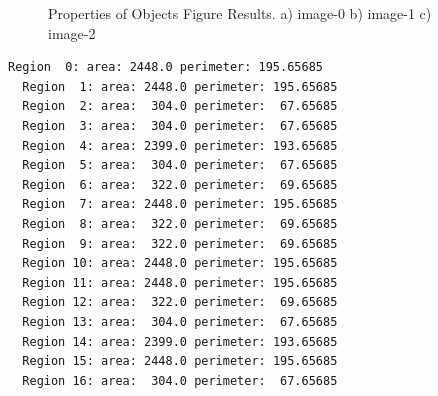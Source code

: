 \documentclass[]{IEEEtran}
\begin{document}
\begin{figure}[]
  \centering
  \caption{Properties of Objects Figure Results. a) image-0 b) image-1 c) image-2}
  \label{fig:labeled}
\end{figure}

\begin{lstlisting}[language=sh, caption={Output for Extracted Properties for Image 0}, label={code:out-1-1}]
  Region  0: area: 2448.0 perimeter: 195.65685 
  Region  1: area: 2448.0 perimeter: 195.65685 
  Region  2: area:  304.0 perimeter:  67.65685 
  Region  3: area:  304.0 perimeter:  67.65685 
  Region  4: area: 2399.0 perimeter: 193.65685 
  Region  5: area:  304.0 perimeter:  67.65685 
  Region  6: area:  322.0 perimeter:  69.65685 
  Region  7: area: 2448.0 perimeter: 195.65685 
  Region  8: area:  322.0 perimeter:  69.65685 
  Region  9: area:  322.0 perimeter:  69.65685 
  Region 10: area: 2448.0 perimeter: 195.65685 
  Region 11: area: 2448.0 perimeter: 195.65685 
  Region 12: area:  322.0 perimeter:  69.65685 
  Region 13: area:  304.0 perimeter:  67.65685 
  Region 14: area: 2399.0 perimeter: 193.65685 
  Region 15: area: 2448.0 perimeter: 195.65685 
  Region 16: area:  304.0 perimeter:  67.65685   
\end{lstlisting}
\end{document}
